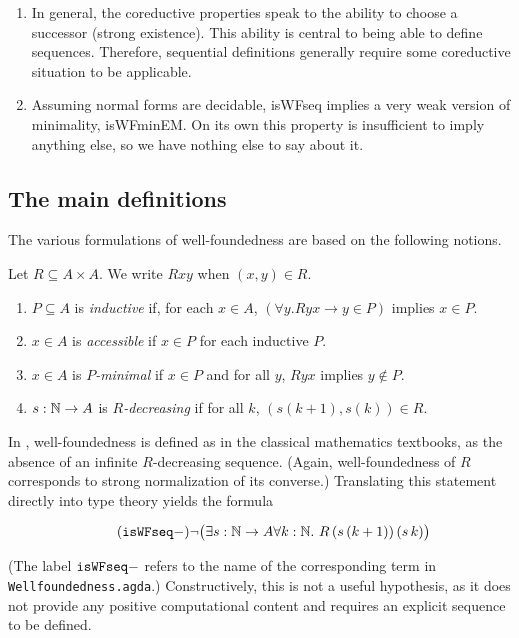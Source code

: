 \begin{enumerate}
  \item In general, the coreductive properties speak to the ability to choose
  a successor (strong existence).  This ability is central to being able to
  define sequences.  Therefore, sequential definitions generally require
  some coreductive situation to be applicable.

  \item Assuming normal forms are decidable,
  isWFseq implies a very weak version of minimality, isWFminEM.
  On its own this property is insufficient to imply anything else,
  so we have nothing else to say about it.
\end{enumerate}

\subsection{The main definitions}

The various formulations of well-foundedness are based on the following notions.
\begin{definition}
  Let $R \subseteq A \times A$.  We write $Rxy$ when $(x,y) \in R$.
  \begin{enumerate}
    \item $P \subseteq A$ is \emph{inductive}
    if, for each $x \in A$, $(\forall y. Ryx \to y \in P)$ implies $x \in P$.

    \item $x \in A$ is \emph{accessible} if $x \in P$ for each inductive $P$.

    \item $x \in A$ is \emph{$P$-minimal} if $x \in P$ and for all $y$,
    $Ryx$ implies $y \notin P$.

    \item $s : \mathbb{N} \to A$ is \emph{$R$-decreasing} if for all $k$, $(s(k+1),s(k)) \in R$.
  \end{enumerate}
\end{definition}

In \cite{Terese}, well-foundedness is defined as in the classical mathematics textbooks,
as the absence of an infinite $R$-decreasing sequence.
(Again, well-foundedness of $R$ corresponds to strong normalization of its converse.)
Translating this statement directly into type theory yields the formula

\[\tag{$\isWFseqm$} \lnot \big(\exists s : \nat \to A \forall k : \nat. \  R \,(s\,(k+1)) \, (s\, k) \big) \]

(The label $\mathtt{isWFseq-}$ refers to the name of the corresponding term in \texttt{Wellfoundedness.agda}.)
Constructively, this is not a useful hypothesis, as it does not provide any positive computational content and requires an explicit sequence to be defined.

